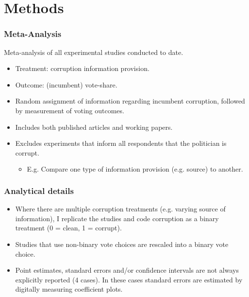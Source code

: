 \documentclass[usenames,dvipsnames]{beamer}
\begin{document}

\section{Methods}

\begin{frame}
\frametitle{Meta-Analysis}
Meta-analysis of all \textcolor{Cerulean}{experimental} studies conducted to date. 
\pause
\begin{itemize}
\item \textcolor{Cerulean}{Treatment}: corruption information provision. 
\pause
\item \textcolor{Cerulean}{Outcome}: (incumbent) vote-share.
\pause
\item Random assignment of information regarding
incumbent corruption, followed by measurement of voting outcomes.
\pause
\item Includes both \textcolor{Cerulean}{published articles and working papers}.
\pause
\item Excludes experiments that inform all respondents that the politician is corrupt.
\begin{itemize}
\item E.g. Compare one type of information provision (e.g. source) to another.
\end{itemize}
\end{itemize}
\end{frame}


\begin{frame}
\frametitle{Analytical details}
\begin{itemize}
\item Where there are multiple corruption treatments (e.g. varying source of information), I replicate the studies and code corruption as a binary treatment (0 = clean, 1 = corrupt).
\pause
\item Studies that use non-binary vote choices are rescaled into a binary vote choice.
\pause
\item Point estimates, standard errors and/or confidence intervals are not always explicitly reported (4 cases). In these cases standard errors are estimated by digitally measuring coefficient plots.
\end{itemize}

\end{frame}

\end{document}

